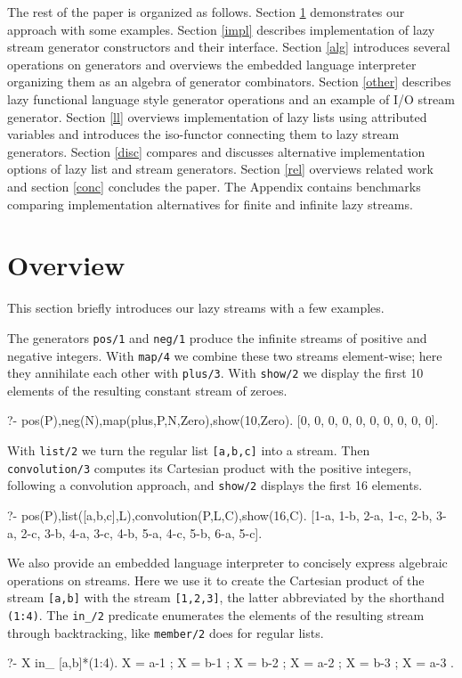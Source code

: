 \documentclass[submission,copyright,creativecommons]{eptcs}
\begin{document}
The rest of the paper is organized as follows.
Section \ref{ov} demonstrates our approach with some examples.
Section \ref{impl} describes implementation of lazy stream generator constructors and 
their  interface.
Section \ref{alg} introduces several operations on generators and overviews the
embedded language interpreter organizing them as an algebra of generator combinators.
Section \ref{other} describes lazy functional language style generator operations
and an example of I/O stream generator.
Section \ref{ll} overviews implementation of lazy lists using attributed variables
and introduces the iso-functor connecting them to  lazy stream generators.
Section \ref{disc} compares and discusses alternative implementation options of lazy list and stream generators.
Section \ref{rel} overviews related work and
section \ref{conc} concludes the paper. The Appendix contains benchmarks comparing implementation alternatives for finite and infinite lazy streams.

\section{Overview}\label{ov}

This section briefly introduces our lazy streams  with a few examples.

The generators {\tt pos/1} and {\tt neg/1} produce the infinite streams of positive
and negative integers. With {\tt map/4} we combine these two streams element-wise;
here they annihilate each other with {\tt plus/3}. With {\tt show/2} we display
the first 10 elements of the resulting constant stream of zeroes.
\begin{codex}
?- pos(P),neg(N),map(plus,P,N,Zero),show(10,Zero).
[0, 0, 0, 0, 0, 0, 0, 0, 0, 0].
\end{codex}
With \texttt{list/2} we turn the regular list \texttt{[a,b,c]} into a stream.
Then {\tt convolution/3} computes its Cartesian product with the positive
integers, following a convolution approach, and {\tt show/2} displays the first 16 elements. 
\begin{codex}
?- pos(P),list([a,b,c],L),convolution(P,L,C),show(16,C).
[1-a, 1-b, 2-a, 1-c, 2-b, 3-a, 2-c, 3-b, 4-a, 3-c, 4-b, 5-a, 4-c, 5-b, 6-a, 5-c].
\end{codex}
We also provide an embedded language interpreter to concisely 
express algebraic operations on streams. Here we use it to create
the Cartesian product of the stream \texttt{[a,b]} with the stream
\texttt{[1,2,3]}, the latter abbreviated by the shorthand \texttt{(1:4)}.
The \texttt{in\_/2} predicate enumerates the elements of the resulting stream
through backtracking, like \texttt{member/2} does for regular lists.
\begin{codex}
?- X in_ [a,b]*(1:4).
X = a-1 ; X = b-1 ; X = b-2 ; X = a-2 ; X = b-3 ; X = a-3 .
\end{codex}
     
\end{document}
